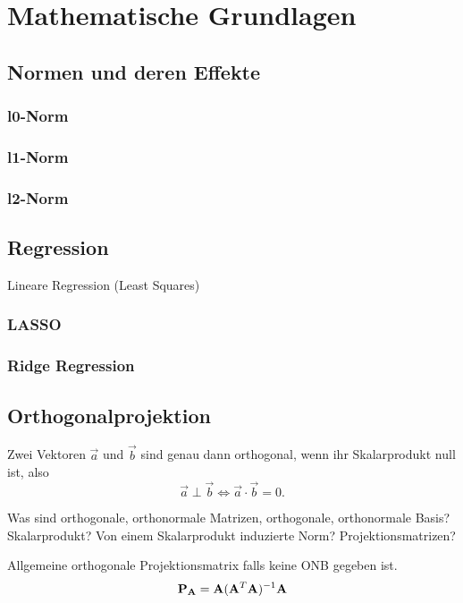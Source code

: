 \chapter{Mathematische Grundlagen}

\label{fundamentals}

\section{Normen und deren Effekte}

\subsection{l0-Norm}
\subsection{l1-Norm}
\subsection{l2-Norm}

\section{Regression}
Lineare Regression (Least Squares)
\subsection{LASSO}
\subsection{Ridge Regression}

\section{Orthogonalprojektion}
\begin{defn}
Zwei Vektoren $\vec a$ und $\vec b$ sind genau dann orthogonal, wenn ihr Skalarprodukt null ist, also
$$\vec a \perp \vec b \iff\vec a \cdot \vec b = 0.$$
\end{defn}

Was sind orthogonale, orthonormale Matrizen, orthogonale, orthonormale Basis?
Skalarprodukt?
Von einem Skalarprodukt induzierte Norm?
Projektionsmatrizen?

Allgemeine orthogonale Projektionsmatrix falls keine ONB gegeben ist.
$$\mathbf{P}_{\mathbf{A}} = \mathbf{A} (\mathbf{A}^T \mathbf{A})^{-1} \mathbf{A}$$

